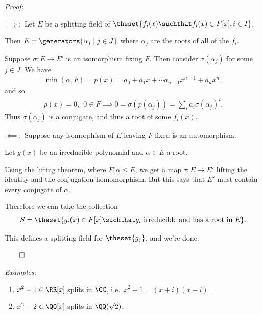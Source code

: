 \emph{Proof:}

\(\implies:\) Let \(E\) be a splitting field of
\(\theset{f_i(x) \suchthat f_i(x) \in F[x], i\in I}\).

Then \(E = \generators{\alpha_j \mid j\in J}\) where \(\alpha_j\) are
the roots of all of the \(f_i\).

Suppose \(\sigma: E \to E'\) is an isomorphism fixing \(F\). Then
consider \(\sigma(\alpha_j)\) for some \(j \in J\). We have
\begin{align*}
\min(\alpha, F) = p(x) = a_0 + a_1 x + \cdots a_{n-1}x^{n-1} + a_n x^n
,\end{align*} and so
\begin{align*}
p(x) = 0,~~ 0\in F \implies 0 = \sigma(p(\alpha_j)) = \sum_i a_i \sigma(\alpha_j)^i
.\end{align*} Thus \(\sigma(\alpha_j)\) is a conjugate, and thus a root
of some \(f_i(x)\).

\(\impliedby:\) Suppose any isomorphism of \(E\) leaving \(F\) fixed is
an automorphism.

Let \(g(x)\) be an irreducible polynomial and \(\alpha \in E\) a root.

\begin{center}
\end{center}

Using the lifting theorem, where \(F(\alpha \leq E\), we get a map
\(\tau: E \to E'\) lifting the identity and the conjugation
homomorphism. But this says that \(E'\) must contain every conjugate of
\(\alpha\).

Therefore we can take the collection
\begin{align*}
S = \theset{g_i(x) \in F[x] \suchthat g_i \text{ irreducible and has a root in } E}
.\end{align*}

This defines a splitting field for \(\theset{g_j}\), and we're done.

\(\qed\)

\emph{Examples:}

\begin{enumerate}
\def\labelenumi{\arabic{enumi}.}
\tightlist
\item
  \(x^2 + 1 \in \RR[x]\) splits in \(\CC\),
  i.e.~\(x^2 + 1 = (x+i)(x-i)\).
\item
  \(x^2 - 2 \in \QQ[x]\) splits in \(\QQ(\sqrt 2)\).
\end{enumerate}

